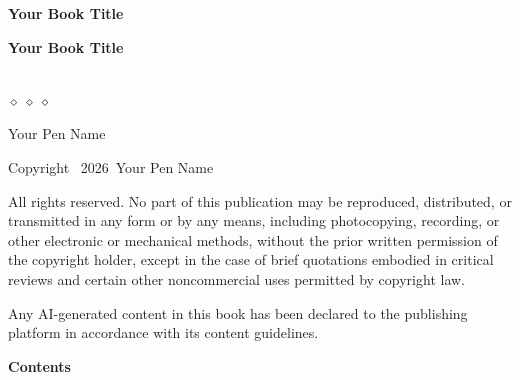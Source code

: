 \documentclass[a5paper, openany, twoside]{memoir}
\newcommand{\booktitle}{Your Book Title}
\newcommand{\booksubtitle}{}
\newcommand{\bookauthor}{Your Pen Name}
\newcommand{\bookyear}{2026}
\newcommand{\ornamentaldivider}{%
  \begin{center}
    \vspace{6pt}
    {\color{accent}\large$\diamond\;\diamond\;\diamond$}
    \vspace{6pt}
  \end{center}
}
\begin{document}
\fontsize{10.5pt}{16pt}\selectfont  %

\pagestyle{plain}

\begin{center}
  \vspace*{\fill}
  {\Large\bfseries\color{accent}\booktitle}
  \vspace*{\fill}
\end{center}
\clearpage

\begin{center}
  \vspace*{\fill}
  {\Huge\bfseries\color{accent}\booktitle}\\[12pt]
  \if\relax\detokenize\expandafter{\booksubtitle}\relax\else
    {\Large\color{textgray}\booksubtitle}\\[40pt]
  \fi
  \ornamentaldivider
  \vspace{10pt}
  {\Large\color{textgray}\bookauthor}
  \vspace*{\fill}
\end{center}
\clearpage

\begin{flushleft}
  \vspace*{\fill}
  {\footnotesize
  Copyright \textcopyright\ \bookyear\ \bookauthor

  \vspace{8pt}
  All rights reserved. No part of this publication may be reproduced, distributed, or transmitted in any form or by any means, including photocopying, recording, or other electronic or mechanical methods, without the prior written permission of the copyright holder, except in the case of brief quotations embodied in critical reviews and certain other noncommercial uses permitted by copyright law.

  \vspace{8pt}
  Any AI-generated content in this book has been declared to the publishing platform in accordance with its content guidelines.
  }
  \vspace*{\fill}
\end{flushleft}
\clearpage

\begin{center}
  {\Large\bfseries\color{tocgray}Contents}
\end{center}
\vspace{16pt}
\setcounter{tocdepth}{2}
\tableofcontents*
\clearpage
\pagestyle{ruled}
\end{document}
